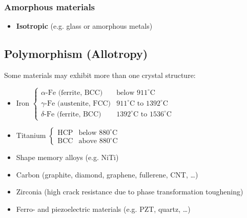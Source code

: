 \documentclass{article}
\begin{document}
\subsubsection{Amorphous materials}
\begin{itemize}
  \item \textbf{Isotropic} (e.g. glass or amorphous metals)
\end{itemize}

\subsection{Polymorphism (Allotropy)}
Some materials may exhibit more than one crystal structure:
\begin{itemize}
  \item Iron $
    \begin{cases}
      \alpha\text{-Fe (ferrite, BCC)} & \text{below } 911^\circ\text{C} \\
      \gamma\text{-Fe (austenite, FCC)} & 911^\circ\text{C} \text{ to } 1392^\circ\text{C} \\
      \delta\text{-Fe (ferrite, BCC)} & 1392^\circ\text{C} \text{ to } 1536^\circ\text{C}
    \end{cases}$
  \item Titanium $
    \begin{cases}
      \text{HCP} & \text{below } 880^\circ\text{C} \\
      \text{BCC} & \text{above } 880^\circ\text{C}
    \end{cases}$
  \item Shape memory alloys (e.g. NiTi)
  \item Carbon (graphite, diamond, graphene, fullerene, CNT, \dots)
  \item Zirconia (high crack resistance due to phase transformation toughening)
  \item Ferro- and piezoelectric materials (e.g. PZT, quartz, \dots)
\end{itemize}
\end{document}
